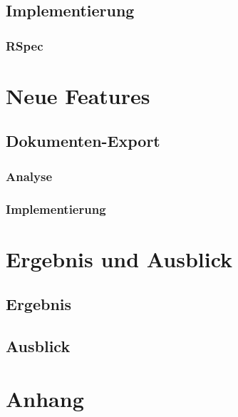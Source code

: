 \documentclass[12pt,             %
               a4paper,          %
               listof=totoc,     %
               index=totoc,      %
               bibliography=totoc,%
               oneside,         %
               BCOR1cm,          %
               english   %
               ]{scrbook}
\begin{document}
\section{Implementierung}
\subsection{RSpec}

\chapter{Neue Features}
\section{Dokumenten-Export}
\subsection{Analyse}
\subsection{Implementierung}
\clearpage


\chapter{Ergebnis und Ausblick}
\section{Ergebnis}
\section{Ausblick}

\clearpage
\chapter{Anhang}

\newpage
\listoffigures

\newpage
\listoftables

\newpage
\lstlistoflistings

\newpage

\end{document}
